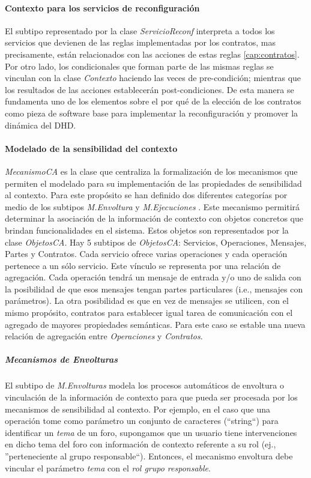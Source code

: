 \paragraph{Contexto para los servicios de reconfiguración}

El subtipo representado por la clase \textit{ServicioReconf} interpreta a todos
los servicios que devienen de las reglas implementadas por los contratos, mas
precisamente, están relacionados con las acciones de estas reglas
\ref{cap:contratos}. Por otro lado, los condicionales que forman parte de las
mismas reglas se vinculan con la clase \textit{Contexto} haciendo las veces de
pre-condición; mientras que los resultados de las acciones
establecerán  post-condiciones. De esta manera se fundamenta uno de los
elementos sobre el por qué de la elección de los contratos como
pieza de software base para implementar la reconfiguración y promover la
dinámica del DHD.  



\paragraph{Modelado de la sensibilidad del contexto}

\textit{MecanismoCA} es la clase que centraliza la formalización de los
mecanismos que permiten el modelado para su implementación de las propiedades
de sensibilidad al contexto. Para este propósito se han definido dos
diferentes categorías por medio de los subtipos \textit{M.Envoltura} y
\textit{M.Ejecuciones }. Este mecanismo permitirá determinar la asociación de
la información de contexto  con objetos concretos que brindan funcionalidades
en el sistema. Estos objetos son representados por la clase \textit{ObjetosCA}.
Hay 5 subtipos de \textit{ObjetosCA}: Servicios, Operaciones, Mensajes, Partes y
Contratos. Cada servicio ofrece varias operaciones y cada operación pertenece
a un sólo servicio. Este vínculo se representa por una relación de
agregación. Cada operación tendrá un mensaje de entrada y/o uno de salida
con la posibilidad de que esos mensajes tengan partes particulares (i.e.,
mensajes con parámetros). La otra posibilidad es que en vez de mensajes se
utilicen, con el mismo propósito, contratos para establecer igual tarea de
comunicación con el agregado de mayores propiedades semánticas.
Para este caso se estable una nueva relación de agregación entre
\textit{Operaciones} y \textit{Contratos}.



\subparagraph{Mecanismos de Envolturas}
El subtipo de \textit{M.Envolturas} modela los procesos automáticos de envoltura
o vinculación de la información de contexto para que pueda ser procesada por
los mecanismos de sensibilidad al contexto. Por ejemplo, en el caso que una
operación tome como parámetro un conjunto de caracteres (``string``) para
identificar un \textit{tema} de un foro, supongamos que un usuario tiene
intervenciones en dicho tema del foro con información de contexto referente a su
rol (ej., ''perteneciente al grupo responsable``). Entonces, el mecanismo
envoltura debe vincular el parámetro \textit{tema} con el \textit{rol grupo
responsable}.

